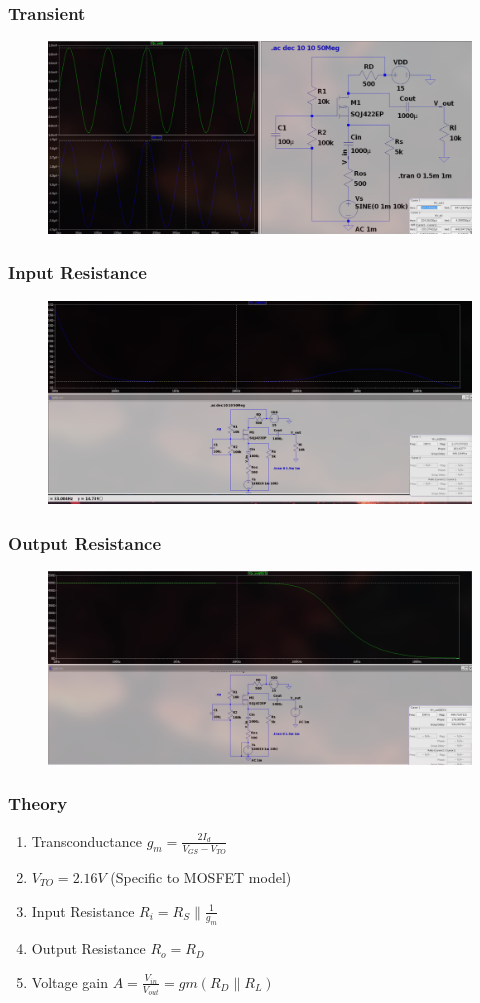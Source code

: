 \documentclass{article}
\newcommand{\brak}[1]{\ensuremath{\left(#1\right)}}
\providecommand{\brak}[1]{\ensuremath{\left(#1\right)}}
\begin{document}
\subsubsection{Transient}
\begin{figure}[h!]
        \centering
        \includegraphics[width=0.7\linewidth]{figs/mosfet_cg_tr.png}
    \end{figure}
    \pagebreak
\subsubsection{Input Resistance}
\begin{figure}[h!]
        \centering
        \includegraphics[width=0.7\linewidth]{figs/mosfet_cg_rin.png}
    \end{figure}
\subsubsection{Output Resistance}
\begin{figure}[h!]
        \centering
        \includegraphics[width=0.7\linewidth]{figs/mosfet_cg_rout.png}
    \end{figure}

\subsubsection{Theory}
\begin{enumerate}
    \item Transconductance $g_m = \frac{2I_d}{V_{GS}-V_{TO}}$
    \item $V_{TO} = 2.16V$ (Specific to MOSFET model)
    \item Input Resistance $R_i = R_{S} \parallel \frac{1}{g_m}$  
    \item Output Resistance $R_o = R_D $ 
    \item Voltage gain $A = \frac{V_{in}}{V_{out}} = gm \brak{R_D\parallel R_L}$ 
\end{enumerate} 
\end{document}
